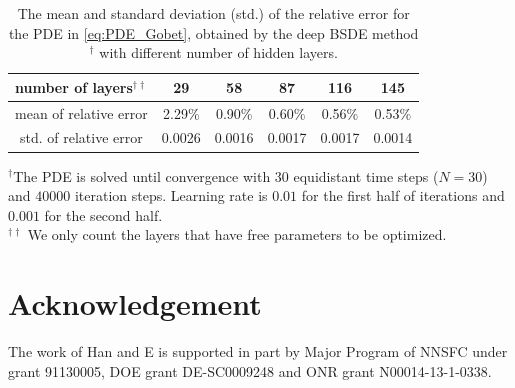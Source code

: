 \documentclass[11pt,english]{article}
\begin{document}
\begin{table}[pht]
\begin{center}
\caption{The mean and standard deviation (std.) of the relative error for the PDE in \eqref{eq:PDE_Gobet}, obtained by the deep BSDE method$^\dagger$ with different number of hidden layers. }
\vspace{8pt}
\label{tab:layer}
\begin{tabular}{@{}c|ccccc}
\toprule
number of layers$^{\dagger\dagger}$ & 29 & 58 & 87 & 116 & 145 
\\  \midrule
mean of relative error & 2.29\% & 0.90\%  & 0.60\% & 0.56\% & 0.53\%\\  
std. of relative error & 0.0026  & 0.0016 & 0.0017 & 0.0017 & 0.0014\\  
\bottomrule
\end{tabular}
\end{center}
\vspace{8pt}
\small{$^\dagger$The PDE is solved until convergence with $30$ equidistant time steps ($N{=}30$) and $40000$ iteration steps. Learning rate is $0.01$ for the first half of iterations and $0.001$ for the second half.\\
$^{\dagger\dagger}$ We only count the layers that have free parameters to be optimized.}
\end{table}


\section*{Acknowledgement}
The work of Han and E is supported in part by Major Program of NNSFC under grant 91130005, DOE grant {DE}-SC0009248 and ONR grant N00014-13-1-0338.

{}

\end{document}
